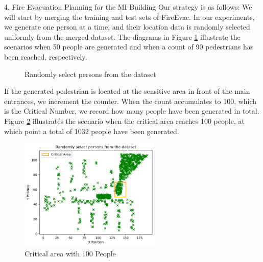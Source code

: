 \begin{task}{4, Fire Evacuation Planning for the MI Building}
Our strategy is as follows: We will start by merging the training and test sets of FireEvac. In our experiments, we generate one person at a time, and their location data is randomly selected uniformly from the merged dataset. The diagrams in Figure \ref{pedestrian} illustrate the scenarios when 50 people are generated and when a count of 90 pedestrians has been reached, respectively. 

\begin{figure}[ht]
\centering

\hfill
{}
\caption{Randomly select persons from the dataset}
\label{pedestrian}
\end{figure}

If the generated pedestrian is located at the sensitive area in front of the main entrances, we increment the counter. When the count accumulates to 100, which is the Critical Number, we record how many people have been generated in total. Figure \ref{pedestrian1032} illustrates the scenario when the critical area reaches 100 people, at which point a total of 1032 people have been generated.
\begin{figure}
\centering
    \includegraphics[width=0.6\textwidth]{images/pedestrians1032.png}
    \caption{Critical area with 100 People}
    \label{pedestrian1032}
\end{figure}


\end{task}
